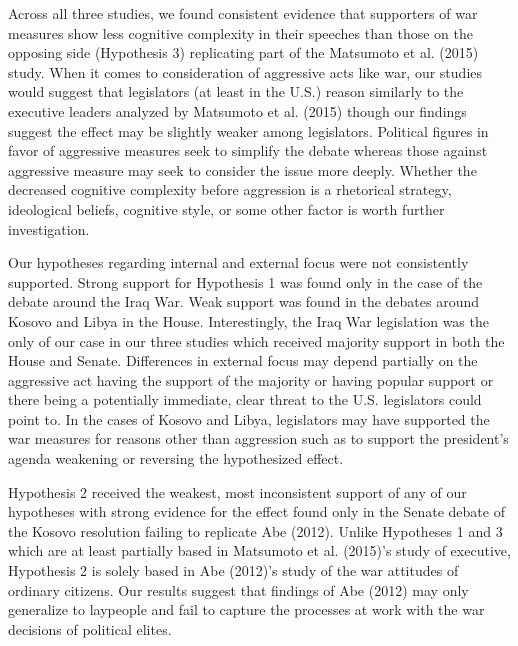 \documentclass[english,,man]{apa6}
\begin{document}
Across all three studies, we found consistent evidence that supporters of war measures show less cognitive complexity in their speeches than those on the opposing side (Hypothesis 3) replicating part of the Matsumoto et al. (2015) study. When it comes to consideration of aggressive acts like war, our studies would suggest that legislators (at least in the U.S.) reason similarly to the executive leaders analyzed by Matsumoto et al. (2015) though our findings suggest the effect may be slightly weaker among legislators. Political figures in favor of aggressive measures seek to simplify the debate whereas those against aggressive measure may seek to consider the issue more deeply. Whether the decreased cognitive complexity before aggression is a rhetorical strategy, ideological beliefs, cognitive style, or some other factor is worth further investigation.

Our hypotheses regarding internal and external focus were not consistently supported. Strong support for Hypothesis 1 was found only in the case of the debate around the Iraq War. Weak support was found in the debates around Kosovo and Libya in the House. Interestingly, the Iraq War legislation was the only of our case in our three studies which received majority support in both the House and Senate. Differences in external focus may depend partially on the aggressive act having the support of the majority or having popular support or there being a potentially immediate, clear threat to the U.S. legislators could point to. In the cases of Kosovo and Libya, legislators may have supported the war measures for reasons other than aggression such as to support the president's agenda weakening or reversing the hypothesized effect.

Hypothesis 2 received the weakest, most inconsistent support of any of our hypotheses with strong evidence for the effect found only in the Senate debate of the Kosovo resolution failing to replicate Abe (2012). Unlike Hypotheses 1 and 3 which are at least partially based in Matsumoto et al. (2015)'s study of executive, Hypothesis 2 is solely based in Abe (2012)'s study of the war attitudes of ordinary citizens. Our results suggest that findings of Abe (2012) may only generalize to laypeople and fail to capture the processes at work with the war decisions of political elites.
\end{document}
